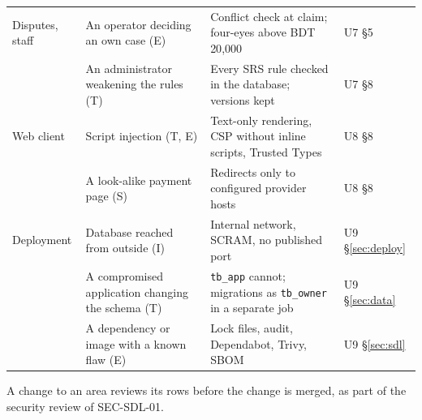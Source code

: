\documentclass[11pt,a4paper]{article}
\begin{document}
{\begin{longtable}{@{}>{\raggedright\arraybackslash}p{2.0cm}>{\raggedright\arraybackslash}p{5.2cm}>{\raggedright\arraybackslash}p{6.0cm}>{\raggedright\arraybackslash}p{1.8cm}@{}}
Disputes, staff & An operator deciding an own case (E) & Conflict check at claim; four-eyes above BDT 20{,}000 & U7 \S5 \\
 & An administrator weakening the rules (T) & Every SRS rule checked in the database; versions kept & U7 \S8 \\
Web client & Script injection (T, E) & Text-only rendering, CSP without inline scripts, Trusted Types & U8 \S8 \\
 & A look-alike payment page (S) & Redirects only to configured provider hosts & U8 \S8 \\
Deployment & Database reached from outside (I) & Internal network, SCRAM, no published port & U9 \S\ref{sec:deploy} \\
 & A compromised application changing the schema (T) & \texttt{tb\_app} cannot; migrations as \texttt{tb\_owner} in a separate job & U9 \S\ref{sec:data} \\
 & A dependency or image with a known flaw (E) & Lock files, audit, Dependabot, Trivy, SBOM & U9 \S\ref{sec:sdl} \\
\bottomrule
\end{longtable}
}
A change to an area reviews its rows before the change is merged, as part of the security review of SEC-SDL-01.
\end{document}
